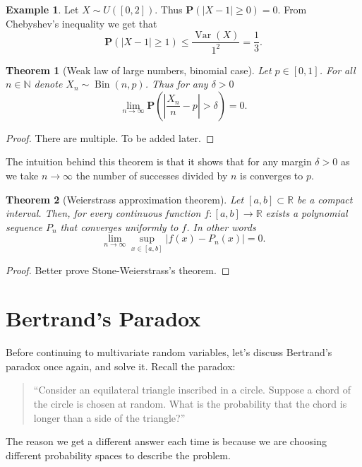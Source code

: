 \documentclass[11pt,a4paper]{article}
\theoremstyle{definition}
\newtheorem{example}{Example}[section]
\theoremstyle{plain}
\newtheorem{theorem}{Theorem}[section]
\DeclareMathOperator{\Bin}{Bin}
\DeclareMathOperator{\Var}{Var}
\newcommand{\N}{\mathbb{N}}
\newcommand{\R}{\mathbb{R}}
\newcommand{\abs}[1]{\left\lvert #1\right\rvert}
\begin{document}
  \begin{example}
    Let $X \sim U([0,2])$. Thus $\mathbf P\left(\abs{X - 1} \geq 0\right) = 0$.
    From Chebyshev's inequality we get that
    \[
      \mathbf P\left(\abs{X - 1} \geq 1\right) \le
      \frac{\Var(X)}{1^2} =
      \frac{1}{3}.
    \]
  \end{example}

  \begin{theorem}[Weak law of large numbers, binomial case]
    Let $p \in [0,1]$. For all $n \in \N$ denote $X_n \sim \Bin(n,p)$.
    Thus for any $\delta > 0$
    \[
      \lim_{n \to \infty}
      \mathbf P\left(\abs{\frac{X_n}{n} - p} > \delta\right) =
      0.
    \]
  \end{theorem}
  \begin{proof}
    There are multiple. To be added later.
  \end{proof}

  The intuition behind this theorem is that it shows that for any margin
  $\delta > 0$ as we take $n \to \infty$ the number of successes divided
  by $n$ is converges to $p$.

  \begin{theorem}[Weierstrass approximation theorem]
    Let $[a,b] \subset \R$ be a compact interval. Then, for every continuous
    function $f \colon [a,b] \to \R$ exists a polynomial sequence $P_n$
    that converges uniformly to $f$. In other words
    \[
      \lim_{n \to \infty}
      \sup_{x \in [a,b]}
      \abs{f(x) - P_n(x)} =
      0.
    \]
  \end{theorem}
  \begin{proof}
    Better prove Stone-Weierstrass's theorem.
  \end{proof}

  \newpage

  \section{Bertrand's Paradox}
  Before continuing to multivariate random variables, let's discuss Bertrand's
  paradox once again, and solve it. Recall the paradox:
  \begin{quote}
  ``Consider an equilateral triangle inscribed in a circle. 
    Suppose a chord of the circle is chosen at random. 
    What is the probability that the chord is longer than a side of the 
    triangle?''
  \end{quote}

  The reason we get a different answer
  each time is because we are choosing different probability
  spaces to describe the problem.
\end{document}
